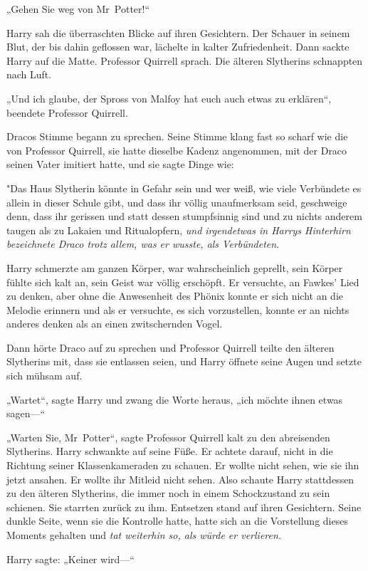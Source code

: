 {„Gehen Sie weg von Mr~Potter!“

Harry sah die überraschten Blicke auf ihren Gesichtern. Der Schauer in seinem Blut, der bis dahin geflossen war, lächelte in kalter Zufriedenheit. Dann sackte Harry auf die Matte. Professor Quirrell sprach. Die älteren Slytherins schnappten nach Luft.

„Und ich glaube, der Spross von Malfoy hat euch auch etwas zu erklären“, beendete Professor Quirrell.

Dracos Stimme begann zu sprechen. Seine Stimme klang fast so scharf wie die von Professor Quirrell, sie hatte dieselbe Kadenz angenommen, mit der Draco seinen Vater imitiert hatte, und sie sagte Dinge wie:

"Das Haus Slytherin könnte in Gefahr sein und wer weiß, wie viele Verbündete es allein in dieser Schule gibt, und dass ihr völlig unaufmerksam seid, geschweige denn, dass ihr gerissen und statt dessen stumpfsinnig sind und zu nichts anderem taugen als zu Lakaien und Ritualopfern, \emph{und irgendetwas in Harrys Hinterhirn bezeichnete Draco trotz allem, was er wusste, als Verbündeten}.

Harry schmerzte am ganzen Körper, war wahrscheinlich geprellt, sein Körper fühlte sich kalt an, sein Geist war völlig erschöpft. Er versuchte, an Fawkes' Lied zu denken, aber ohne die Anwesenheit des Phönix konnte er sich nicht an die Melodie erinnern und als er versuchte, es sich vorzustellen, konnte er an nichts anderes denken als an einen zwitschernden Vogel.

Dann hörte Draco auf zu sprechen und Professor Quirrell teilte den älteren Slytherins mit, dass sie entlassen seien, und Harry öffnete seine Augen und setzte sich mühsam auf.

„Wartet“, sagte Harry und zwang die Worte heraus, „ich möchte ihnen etwas sagen—“

„Warten Sie, Mr~Potter“, sagte Professor Quirrell kalt zu den abreisenden Slytherins. Harry schwankte auf seine Füße. Er achtete darauf, nicht in die Richtung seiner Klassenkameraden zu schauen. Er wollte nicht sehen, wie sie ihn jetzt ansahen. Er wollte ihr Mitleid nicht sehen. Also schaute Harry stattdessen zu den älteren Slytherins, die immer noch in einem Schockzustand zu sein schienen. Sie starrten zurück zu ihm. Entsetzen stand auf ihren Gesichtern. Seine dunkle Seite, wenn sie die Kontrolle hatte, hatte sich an die Vorstellung dieses Moments gehalten und \emph{tat weiterhin so, als würde er verlieren.}

Harry sagte: „Keiner wird—“

}
